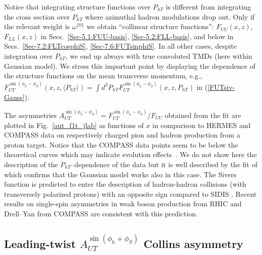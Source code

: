 \documentclass[a4paper,11pt]{article}
\newcommand{\la}{\langle}
\newcommand{\ra}{\rangle}
\newcommand{\bp}[1]{{\color[rgb]{0,0.65,0.35}#1}}
\def\Phperp{P_{hT}}
\begin{document}
Notice that integrating structure functions over $\Phperp$
is different from integrating the cross section over $\Phperp$
where azimuthal hadron modulations drop out.
Only if the relevant weight is $\omega^{\{0\}}$ we obtain 
``collinear structure functions'':  $F_{UU}(x,z)$, $F_{LL}(x,z)$
in Secs.~\ref{Sec-5.1:FUU-basis}, \ref{Sec-5.2:FLL-basis},
and below in Secs.~\ref{Sec-7.2:FLTcosphiS}, \ref{Sec-7.6:FUTsinphiS}.
In all other cases, despite integration over $\Phperp$, we end up
always with true convoluted TMDs (here within Gaussian model).
We stress this important point by displaying the dependence of
the structure functions on the mean transverse momentum, e.g.,
$F_{UT}^{\sin(\phi_h-\phi_S)}(x,z,\la\Phperp\ra) =
\int d^2\Phperp F_{UT}^{\sin(\phi_h-\phi_S)}(x,z,\Phperp)$
in (\ref{FUTsiv-Gauss}).

The asymmetries $A_{UT}^{\sin(\phi_h-\phi_S)}= F_{UT}^{\sin(\phi_h-\phi_S)}/F_{UU}$
obtained from the fit \cite{Anselmino:2011gs}
are plotted in Fig.~\ref{aut_f1t_jlab} as functions of $x$ in comparison
to HERMES \cite{Airapetian:2009ae} and COMPASS \cite{Adolph:2012sp} data
on respectively charged pion and hadron production from a proton target.
	Notice that the COMPASS data points seem to be below the
	theoretical curves which may indicate evolution
	effects~\cite{Aybat:2011ta,Anselmino:2012aa}.
We do not show here the description of the $P_{hT}$--dependence of the
data but it is well described by the fit of \cite{Anselmino:2011gs}
which confirms that the Gaussian model works also in this case.
\bp{The Sivers function is predicted to enter the description of hadron-hadron 
collisions (with transversely polarized protons) with an opposite sign 
compared to SIDIS \cite{Collins:2002kn,Brodsky:2002cx,Brodsky:2002rv}.
Recent results on single-spin asymmetries in weak boson production 
from RHIC \cite{Adamczyk:2015gyk} and Drell--Yan from COMPASS 
\cite{Aghasyan:2017jop,Parsamyan:2018zju} are consistent 
with this prediction.}



\subsection{\boldmath Leading-twist $A_{UT}^{\sin(\phi_h+\phi_S)}$ Collins asymmetry}
\label{Sec-5.4:Collins-basis}
\end{document}
